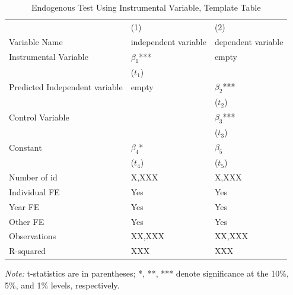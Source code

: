 \begin{table}[htbp]
    \caption{Endogenous Test Using Instrumental Variable, Template Table}
    \label{Use the regression name as the label}
    \centering
    \begin{tabular}{p{5cm}p{3cm}p{3cm}} %
    \toprule
    & (1) & (2) \\
    Variable Name  & independent variable  & dependent variable  \\
    \midrule
    Instrumental Variable   & $\beta_1$*** & empty \\
                & ($t_1$) &  \\
    Predicted Independent variable   & empty & $\beta_2$***\\
                &  & ($t_2$) \\
    Control Variable     &  & $\beta_3$*** \\  %
                &  & ($t_3$) \\
    Constant    & $\beta_4$* & $\beta_5$ \\
                & ($t_4$) & ($t_5$) \\
    
    Number of id       & X,XXX        & X,XXX \\
    Individual FE      & Yes         & Yes \\ %
    Year FE            & Yes         & Yes \\ %
    Other FE           & Yes         & Yes \\ %
    Observations       & XX,XXX       & XX,XXX \\
    R-squared          & XXX        & XXX \\
    \bottomrule
    \end{tabular}
    \begin{tablenotes}
    \small
    \item \textit{Note:} t-statistics are in parentheses; *, **, *** denote significance at the 10\%, 5\%, and 1\% levels, respectively.
    \end{tablenotes}
    \end{table}